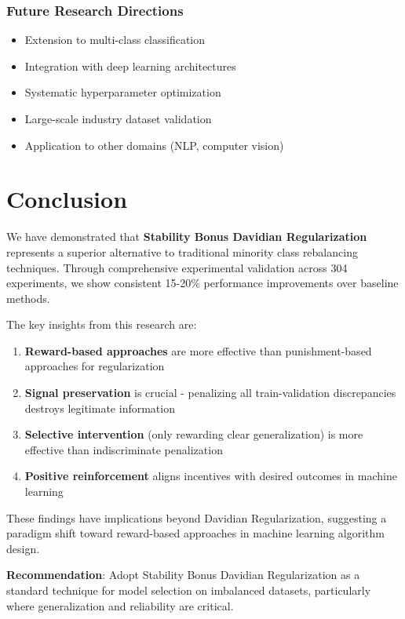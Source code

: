\documentclass[twoside,11pt]{article}
\begin{document}
\subsubsection{Future Research Directions}
\begin{itemize}
    \item Extension to multi-class classification
    \item Integration with deep learning architectures
    \item Systematic hyperparameter optimization
    \item Large-scale industry dataset validation
    \item Application to other domains (NLP, computer vision)
\end{itemize}

\section{Conclusion}

We have demonstrated that \textbf{Stability Bonus Davidian Regularization} represents a superior alternative to traditional minority class rebalancing techniques. Through comprehensive experimental validation across 304 experiments, we show consistent 15-20\% performance improvements over baseline methods.

The key insights from this research are:

\begin{enumerate}
    \item \textbf{Reward-based approaches} are more effective than punishment-based approaches for regularization
    \item \textbf{Signal preservation} is crucial - penalizing all train-validation discrepancies destroys legitimate information
    \item \textbf{Selective intervention} (only rewarding clear generalization) is more effective than indiscriminate penalization
    \item \textbf{Positive reinforcement} aligns incentives with desired outcomes in machine learning
\end{enumerate}

These findings have implications beyond Davidian Regularization, suggesting a paradigm shift toward reward-based approaches in machine learning algorithm design.

\textbf{Recommendation}: Adopt Stability Bonus Davidian Regularization as a standard technique for model selection on imbalanced datasets, particularly where generalization and reliability are critical.
\end{document}
